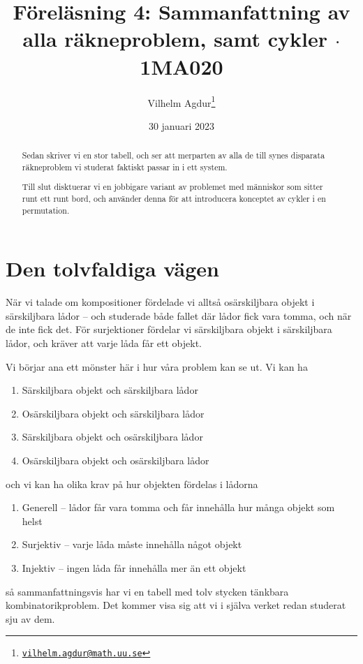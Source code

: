 \documentclass[nobib]{tufte-handout}
\title{Föreläsning 4: Sammanfattning av alla räkneproblem, samt cykler $\cdot$ 1MA020}
\author[Vilhelm Agdur]{Vilhelm Agdur\thanks{\href{mailto:vilhelm.agdur@math.uu.se}{\nolinkurl{vilhelm.agdur@math.uu.se}}}}
\date{30 januari 2023}
\begin{document}

\maketitle%

\begin{abstract}
\noindent
Sedan skriver vi en stor tabell, och ser att merparten av alla de till synes disparata räkneproblem vi studerat faktiskt passar in i ett system.

Till slut disktuerar vi en jobbigare variant av problemet med människor som sitter runt ett runt bord, och använder denna för att introducera konceptet av cykler i en permutation.
\end{abstract}

\section{Den tolvfaldiga vägen}

När vi talade om kompositioner fördelade vi alltså osärskiljbara objekt i särskiljbara lådor -- och studerade både fallet där lådor fick vara tomma, och när de inte fick det. För surjektioner fördelar vi särskiljbara objekt i särskiljbara lådor, och kräver att varje låda får ett objekt.

Vi börjar ana ett mönster här i hur våra problem kan se ut. Vi kan ha
\begin{enumerate}
  \item Särskiljbara objekt och särskiljbara lådor
  \item Osärskiljbara objekt och särskiljbara lådor
  \item Särskiljbara objekt och osärskiljbara lådor
  \item Osärskiljbara objekt och osärskiljbara lådor
\end{enumerate}
och vi kan ha olika krav på hur objekten fördelas i lådorna
\begin{enumerate}
  \item Generell -- lådor får vara tomma och får innehålla hur många objekt som helst
  \item Surjektiv -- varje låda måste innehålla något objekt
  \item Injektiv -- ingen låda får innehålla mer än ett objekt
\end{enumerate}
så sammanfattningsvis har vi en tabell med tolv stycken tänkbara kombinatorikproblem. Det kommer visa sig att vi i själva verket redan studerat sju av dem.
\end{document}
